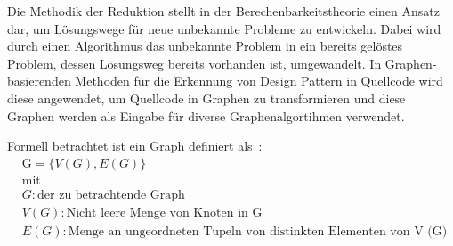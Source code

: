 Die Methodik der Reduktion stellt in der Berechenbarkeitstheorie einen Ansatz dar, um Lösungswege für neue unbekannte Probleme zu entwickeln. Dabei wird durch einen Algorithmus das unbekannte Problem in ein bereits gelöstes Problem, dessen Lösungsweg bereits vorhanden ist, umgewandelt.
In Graphen-basierenden Methoden für die Erkennung von Design Pattern in Quellcode wird diese angewendet, um Quellcode in Graphen zu transformieren und diese Graphen werden als Eingabe für diverse Graphenalgortihmen verwendet.

\pagebreak

Formell betrachtet ist ein Graph definiert als~\cite[S. 9]{Siu1998IntroductionTG}:
\begin{align*}
& \text{G} = \{V(G), E(G)\}
&\\
&\text{mit}
&\\
&G : \text{der zu betrachtende Graph}\\
&V (G): \text{Nicht leere Menge von Knoten in G}\\
&E (G): \text{Menge an ungeordneten Tupeln von distinkten Elementen von V (G)}
\end{align*}

